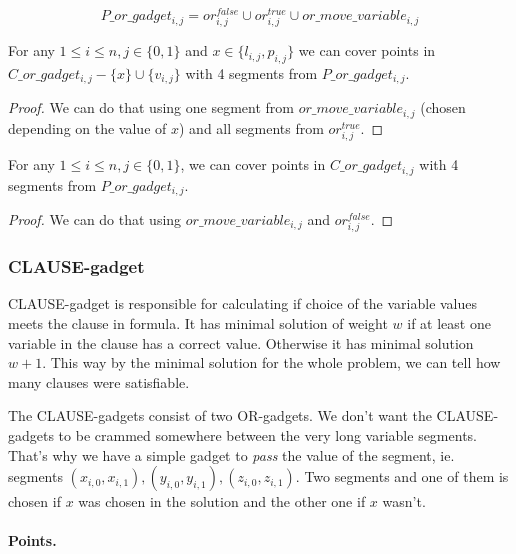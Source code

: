 $$P\_or\_gadget_{i, j} = 
  or^{false}_{i, j} \cup or^{true}_{i, j} \cup or\_move\_variable_{i, j}
  $$


\begin{lemma}
\label{cover_or_true}
For any $1 \le i \le n, j \in \{0, 1\}$ and 
 $x \in \{l_{i, j}, p_{i, j}\}$ we can cover points in
$C\_or\_gadget_{i, j} - \{ x\} \cup \{v_{i, j}\}$
with 4 segments from $P\_or\_gadget_{i,j}$.
\end{lemma}

\begin{proof}
We can do that using one segment from
$or\_move\_variable_{i, j}$
(chosen depending on the value of $x$)
and all segments from $or^{true}_{i, j}$.
\end{proof}

\begin{lemma}
\label{cover_or_false}
For any $1 \le i \le n, j \in \{0, 1\}$, we can cover points in
$C\_or\_gadget_{i, j}$ with 4 segments from $P\_or\_gadget_{i,j}$.
\end{lemma}

\begin{proof}
We can do that using  $or\_move\_variable_{i, j}$
and $or^{false}_{i, j}$.
\end{proof}


\subsubsection{CLAUSE-gadget}


CLAUSE-gadget is responsible for calculating if choice of the
variable values meets the clause in formula.
It has minimal solution of weight $w$ if at least one variable
in the clause has a correct value.
Otherwise it has minimal solution $w+1$.
This way by the minimal solution for the whole problem, we can tell
how many clauses were satisfiable.

The CLAUSE-gadgets consist of two OR-gadgets.
We don't want the CLAUSE-gadgets to be crammed 
somewhere between
the very long variable segments. That's why we have a simple
gadget to \textit{pass} the value of the segment, ie. segments
$(x_{i, 0}, x_{i, 1}), (y_{i, 0}, y_{i, 1}), (z_{i, 0}, z_{i, 1})$.
Two segments and one of them is chosen if $x$ was chosen
in the solution and the other one if $x$ wasn't.

\paragraph{Points.}


